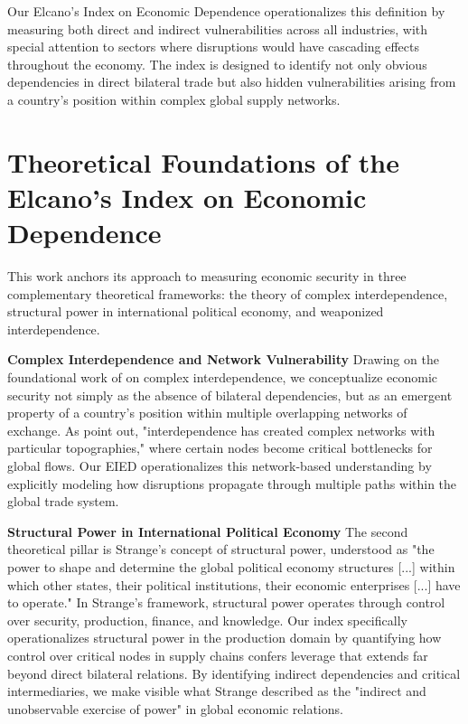 \documentclass[final,1p,times,authoryear]{elsarticle}
\begin{document}
Our Elcano's Index on Economic Dependence operationalizes this definition by measuring both direct and indirect vulnerabilities across all industries, with special attention to sectors where disruptions would have cascading effects throughout the economy. The index is designed to identify not only obvious dependencies in direct bilateral trade but also hidden vulnerabilities arising from a country's position within complex global supply networks.

\section{Theoretical Foundations of the Elcano's Index on Economic Dependence}

This work anchors its approach to measuring economic security in three complementary theoretical frameworks: the theory of complex interdependence, structural power in international political economy, and weaponized interdependence.

\textbf{Complex Interdependence and Network Vulnerability}
Drawing on the foundational work of \cite{keohane1977power} on complex interdependence, we conceptualize economic security not simply as the absence of bilateral dependencies, but as an emergent property of a country's position within multiple overlapping networks of exchange. As \cite{farrell2019weaponized} point out, "interdependence has created complex networks with particular topographies," where certain nodes become critical bottlenecks for global flows. Our EIED operationalizes this network-based understanding by explicitly modeling how disruptions propagate through multiple paths within the global trade system.

\textbf{Structural Power in International Political Economy}
The second theoretical pillar is Strange's \citeyear{strange1988states} concept of structural power, understood as "the power to shape and determine the global political economy structures [...] within which other states, their political institutions, their economic enterprises [...] have to operate." In Strange's framework, structural power operates through control over security, production, finance, and knowledge. Our index specifically operationalizes structural power in the production domain by quantifying how control over critical nodes in supply chains confers leverage that extends far beyond direct bilateral relations. By identifying indirect dependencies and critical intermediaries, we make visible what Strange described as the "indirect and unobservable exercise of power" in global economic relations.
\end{document}
